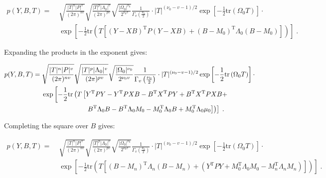 \vspace{-0.5em}
\begin{equation} \label{eq:MGLM-NW-JL2}
\begin{split}
p(Y,B,T) = \; & \sqrt{\frac{|T|^n |P|^v}{(2 \pi)^{nv}}} \sqrt{\frac{|T|^p |\Lambda_0|^v}{(2 \pi)^{pv}}} \sqrt{\frac{|\Omega_0|^{\nu_0}}{2^{\nu_0 v}}} \frac{1}{\Gamma_v \left( \frac{\nu_0}{2} \right)} \cdot |T|^{(\nu_0-v-1)/2} \exp\left[ -\frac{1}{2} \mathrm{tr}\left( \Omega_0 T \right) \right] \cdot \\
& \exp\left[ -\frac{1}{2} \mathrm{tr}\left( T \left[ (Y-XB)^\mathrm{T} P (Y-XB) + (B-M_0)^\mathrm{T} \Lambda_0 (B-M_0) \right] \right) \right] \; .
\end{split}
\end{equation}

\pagebreak
Expanding the products in the exponent gives:

\vspace{-0.5em}
\begin{equation} \label{eq:MGLM-NW-JL3}
\begin{split}
p(Y,B,T) = \; & \sqrt{\frac{|T|^n |P|^v}{(2 \pi)^{nv}}} \sqrt{\frac{|T|^p |\Lambda_0|^v}{(2 \pi)^{pv}}} \sqrt{\frac{|\Omega_0|^{\nu_0}}{2^{\nu_0 v}}} \frac{1}{\Gamma_v \left( \frac{\nu_0}{2} \right)} \cdot |T|^{(\nu_0-v-1)/2} \exp\left[ -\frac{1}{2} \mathrm{tr}\left( \Omega_0 T \right) \right] \cdot \\
& \exp\left[ -\frac{1}{2} \mathrm{tr}\left( T \left[ Y^\mathrm{T} P Y - Y^\mathrm{T} P X B - B^\mathrm{T} X^\mathrm{T} P Y + B^\mathrm{T} X^\mathrm{T} P X B + \right. \right. \right. \\
& \hphantom{\exp\left[ -\frac{1}{2} \mathrm{tr}\left( T \left[ \right. \right. \right. \!\!\!} \; \left. \left. \left. B^\mathrm{T} \Lambda_0 B - B^\mathrm{T} \Lambda_0 M_0 - M_0^\mathrm{T} \Lambda_0 B + M_0^\mathrm{T} \Lambda_0 \mu_0 \right] \right) \right] \; .
\end{split}
\end{equation}

Completing the square over $B$ gives:

\vspace{-0.5em}
\begin{equation} \label{eq:MGLM-NW-JL4}
\begin{split}
p(Y,B,T) = \; & \sqrt{\frac{|T|^n |P|^v}{(2 \pi)^{nv}}} \sqrt{\frac{|T|^p |\Lambda_0|^v}{(2 \pi)^{pv}}} \sqrt{\frac{|\Omega_0|^{\nu_0}}{2^{\nu_0 v}}} \frac{1}{\Gamma_v \left( \frac{\nu_0}{2} \right)} \cdot |T|^{(\nu_0-v-1)/2} \exp\left[ -\frac{1}{2} \mathrm{tr}\left( \Omega_0 T \right) \right] \cdot \\
& \exp\left[ -\frac{1}{2} \mathrm{tr}\left( T \left[ (B-M_n)^\mathrm{T} \Lambda_n (B-M_n) + (Y^\mathrm{T} P Y + M_0^\mathrm{T} \Lambda_0 M_0 - M_n^\mathrm{T} \Lambda_n M_n) \right] \right) \right] \; .
\end{split}
\end{equation}


